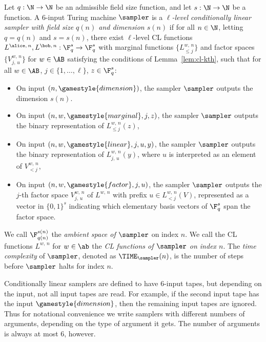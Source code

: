 \begin{definition}
  \label{def:sampler}
	Let $q:\N \to \N$ be an admissible field size function, and let $s: \N \to \N$
  be a function.
  A $6$-input Turing machine $\sampler$ is a \emph{$\ell$-level conditionally
    linear sampler with field size $q(n)$ and dimension $s(n)$} if for all $n
  \in \N$, letting $q = q(n)$ and $s = s(n)$, there exist $\ell$-level CL
  functions $L^{\alice,\, n}, L^{\bob,\, n} : \F_q^s \to \F_q^s$ with marginal functions
  $\{ L^{w,\, n}_{\leq j}\}$ and factor spaces $\{V^{w,\, n}_{j,\, u}\}$ for $w \in \AB$
  satisfying the conditions of Lemma~\ref{lem:cl-kth}, such that for all $w \in
  \AB$, $j \in \{1,\ldots,\ell\}$, $z \in \F_q^s$:
  \begin{itemize}
  \item On input $(n, \gamestyle{dimension})$, the sampler $\sampler$ outputs the
    dimension $s(n)$.
  \item On input $(n, w, \gamestyle{marginal}, j, z)$, the sampler $\sampler$
    outputs the binary representation of $L^{w,\, n}_{\leq j}(z)$,
	 \item On input $(n, w, \gamestyle{linear}, j, u, y)$, the sampler $\sampler$
    outputs the binary representation of $L^{w,\, n}_{j,\, u}(y)$, where $u$ is
    interpreted as an element of $V^{w,\, n}_{<j}$,
	\item On input $(n, w, \gamestyle{factor}, j, u)$, the sampler $\sampler$
    outputs the $j$-th factor space $V^{w,\, n}_{j,\, u}$ of $L^{w,\, n}$ with
    prefix $u \in L^{w,\, n}_{<j}(V)$, represented as a vector in
    $\{0,1\}^s$ indicating which elementary basis vectors of $\F_q^s$ span the factor space.
  \end{itemize}
  We call $\F_{q(n)}^{s(n)}$ the \emph{ambient space of $\sampler$} on index $n$.
  We call the CL functions $L^{w,\, n}$ for $w \in \ab$ the \emph{CL functions
    of $\sampler$ on index $n$}.
  The \emph{time complexity} of $\sampler$, denoted as $\TIME_\sampler(n)$, is
  the number of steps before $\sampler$ halts for index $n$.
\end{definition}

\begin{remark}
  \label{rmk:sampler-inputs}
  Conditionally linear samplers are defined to have $6$-input tapes, but
  depending on the input, not all input tapes are read.
  For example, if the second input tape has the input $\gamestyle{dimension}$,
  then the remaining input tapes are ignored.
  Thus for notational convenience we write samplers with different numbers of
  arguments, depending on the type of argument it gets.
  The number of arguments is always at most $6$, however.
\end{remark}

